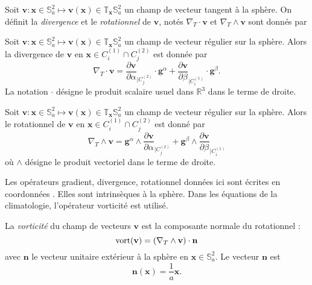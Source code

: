Soit $\mathbf{v} : \mathbf{x} \in \mathbb{S}_a^2 \mapsto \mathbf{v}(\mathbf{x}) \in \mathbb{T}_{\mathbf{x}} \mathbb{S}_a^2$ un champ de vecteur tangent à la sphère. On définit la \textit{divergence} et le \textit{rotationnel} de $\mathbf{v}$, notés $\nabla_T \cdot \mathbf{v}$ et $\nabla_T \wedge \mathbf{v}$ sont donnés par

\begin{definition}
Soit $\mathbf{v} : \mathbf{x} \in \mathbb{S}_a^2 \mapsto \mathbf{v}(\mathbf{x}) \in \mathbb{T}_{\mathbf{x}} \mathbb{S}_a^2$ un champ de vecteur régulier sur la sphère. Alors la divergence de $\mathbf{v}$ en $\mathbf{x} \in C_i^{(1)} \cap C_j^{(2)}$ est donnée par
\begin{equation}
\nabla_T \cdot \mathbf{v} = \dfrac{\partial \mathbf{v}}{\partial \alpha}_{|C^{(2)}_j} \cdot \mathbf{g}^{\alpha} + \dfrac{\partial \mathbf{v}}{\partial \beta}_{|C^{(1)}_i} \cdot \mathbf{g}^{\beta}.
\end{equation}
\label{def:divergence}
La notation $\cdot$ désigne le produit scalaire usuel dans $\mathbb{R}^3$ dans le terme de droite.
\end{definition}

\begin{definition}
Soit $\mathbf{v} : \mathbf{x} \in \mathbb{S}_a^2 \mapsto \mathbf{v}(\mathbf{x}) \in \mathbb{T}_{\mathbf{x}} \mathbb{S}_a^2$ un champ de vecteur régulier sur la sphère. Alors le rotationnel de $\mathbf{v}$ en $\mathbf{x} \in C_i^{(1)} \cap C_j^{(2)}$ est donné par
\begin{equation}
\nabla_T \wedge \mathbf{v} =  \mathbf{g}^{\alpha} \wedge \dfrac{\partial \mathbf{v}}{\partial \alpha}_{|C^{(2)}_j} + \mathbf{g}^{\beta} \wedge \dfrac{\partial \mathbf{v}}{\partial \beta}_{|C^{(1)}_i}
\end{equation}
où $\wedge$ désigne le produit vectoriel dans le terme de droite.
\label{def:rotationnel}
\end{definition}

Les opérateurs gradient, divergence, rotationnel données ici sont écrites en coordonnées \cite{Simmonds1994}. Elles sont intrinsèques à la sphère. Dans les équations de la climatologie, l'opérateur vorticité est utilisé.

\begin{definition}
La \textit{vorticité} du champ de vecteurs $\mathbf{v}$ est la composante normale du rotationnel :
\begin{equation}
\text{vort} ( \mathbf{v} ) = \left( \nabla_T \wedge \mathbf{v} \right) \cdot \mathbf{n}
\label{eq:vorticité}
\end{equation}
avec $\mathbf{n}$ le vecteur unitaire extérieur à la sphère en $\mathbf{x} \in \mathbb{S}_a^2$. Le vecteur $\mathbf{n}$ est
\begin{equation}
\mathbf{n}(\mathbf{x}) = \dfrac{1}{a} \mathbf{x}.
\end{equation}
\label{def:vorticité}
\end{definition}


